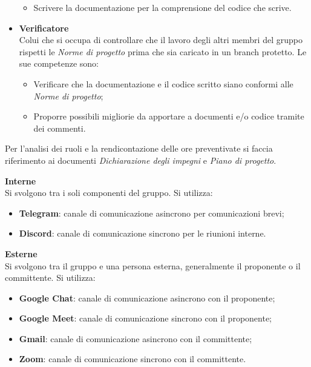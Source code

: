 \begin{itemize}
\begin{itemize}
              \item Scrivere la documentazione per la comprensione del codice che scrive.
          \end{itemize}
    \item \textbf{Verificatore}\\
          Colui che si occupa di controllare che il lavoro degli altri membri del gruppo rispetti le \textit{Norme di progetto}
          prima che sia caricato in un branch protetto.
          Le sue competenze sono:
          \begin{itemize}
              \item Verificare che la documentazione e il codice scritto siano conformi alle
                    \textit{Norme di progetto};
              \item Proporre possibili migliorie da apportare a documenti e/o codice tramite dei
                    commenti.
          \end{itemize}
\end{itemize}

Per l'analisi dei ruoli e la rendicontazione delle ore preventivate si faccia
riferimento ai documenti \textit{Dichiarazione degli impegni} e \textit{Piano
    di progetto}.

\noindent \textbf{Interne}\\
    Si svolgono tra i soli componenti del gruppo. Si utilizza:
    \begin{itemize}
        \item \textbf{Telegram}: canale di comunicazione asincrono per comunicazioni brevi;
        \item \textbf{Discord}: canale di comunicazione sincrono per le riunioni interne.
    \end{itemize}
\vspace{1em}

\noindent \textbf{Esterne} \\
    Si svolgono tra il gruppo e una persona esterna, generalmente il proponente
    o il committente. Si utilizza:
    \begin{itemize}
        \item \textbf{Google Chat}: canale di comunicazione asincrono con il proponente;
        \item \textbf{Google Meet}: canale di comunicazione sincrono con il proponente;
        \item \textbf{Gmail}: canale di comunicazione asincrono con il committente;
        \item \textbf{Zoom}: canale di comunicazione sincrono con il committente.
    \end{itemize}
    
